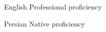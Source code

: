 
\begin{cvskills}

  \cvskill
    {English} %
    {Professional proficiency} %

  \cvskill
    {Persian} %
    {Native proficiency} %
    
\end{cvskills}
